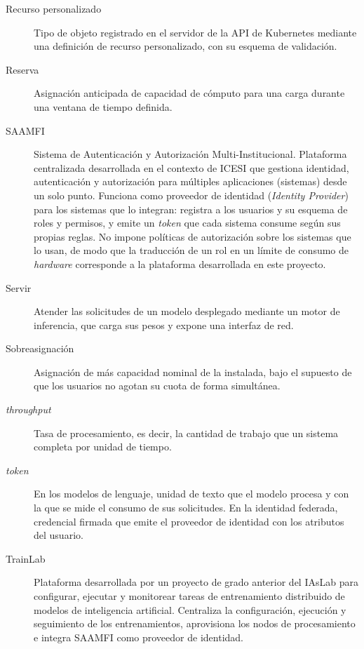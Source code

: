 \documentclass[letterpaper,11pt]{report}
\begin{document}
\begin{description}
  \item[Recurso personalizado] Tipo de objeto registrado en el servidor de la API de Kubernetes mediante una definición de recurso personalizado, con su esquema de validación.
  \item[Reserva] Asignación anticipada de capacidad de cómputo para una carga durante una ventana de tiempo definida.
  \item[SAAMFI] Sistema de Autenticación y Autorización Multi-Institucional. Plataforma centralizada desarrollada en el contexto de ICESI que gestiona identidad, autenticación y autorización para múltiples aplicaciones (sistemas) desde un solo punto. Funciona como proveedor de identidad (\emph{Identity Provider}) para los sistemas que lo integran: registra a los usuarios y su esquema de roles y permisos, y emite un \emph{token} que cada sistema consume según sus propias reglas. No impone políticas de autorización sobre los sistemas que lo usan, de modo que la traducción de un rol en un límite de consumo de \emph{hardware} corresponde a la plataforma desarrollada en este proyecto.
  \item[Servir] Atender las solicitudes de un modelo desplegado mediante un motor de inferencia, que carga sus pesos y expone una interfaz de red.
  \item[Sobreasignación] Asignación de más capacidad nominal de la instalada, bajo el supuesto de que los usuarios no agotan su cuota de forma simultánea.
  \item[\emph{throughput}] Tasa de procesamiento, es decir, la cantidad de trabajo que un sistema completa por unidad de tiempo.
  \item[\emph{token}] En los modelos de lenguaje, unidad de texto que el modelo procesa y con la que se mide el consumo de sus solicitudes. En la identidad federada, credencial firmada que emite el proveedor de identidad con los atributos del usuario.
  \item[TrainLab] Plataforma desarrollada por un proyecto de grado anterior del IAsLab para configurar, ejecutar y monitorear tareas de entrenamiento distribuido de modelos de inteligencia artificial. Centraliza la configuración, ejecución y seguimiento de los entrenamientos, aprovisiona los nodos de procesamiento e integra SAAMFI como proveedor de identidad.
\end{description}

\clearpage
{}










\end{document}

